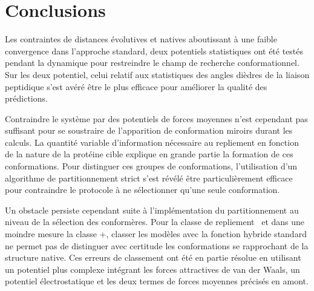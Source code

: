\chapter{Conclusions} %
\label{ch:03-04} %


Les contraintes de distances évolutives et natives aboutissant à une faible convergence dans l'approche standard, deux potentiels statistiques ont été testés pendant la dynamique pour restreindre le champ de recherche conformationnel. Sur les deux potentiel, celui relatif aux statistiques des angles dièdres de la liaison peptidique s'est avéré être le plus efficace pour améliorer la qualité des prédictions. 

Contraindre le système par des potentiels de forces moyennes n'est cependant pas suffisant pour se soustraire de l'apparition de conformation miroirs durant les calculs. La quantité variable d'information nécessaire au repliement en fonction de la nature de la protéine cible \citep{murzin_principles_1994} explique en grande partie la formation de ces conformations. Pour distinguer ces groupes de conformations, l'utilisation d'un algorithme de partitionnement strict s'est révélé être particulièrement efficace pour contraindre le protocole à ne sélectionner qu'une seule conformation. 

Un obstacle persiste cependant suite à l'implémentation du partitionnement au niveau de la sélection des conformères. Pour la classe de repliement \textbeta~et dans une moindre mesure la classe \textalpha+\textbeta, classer les modèles avec la fonction hybride standard ne permet pas de distinguer avec certitude les conformations se rapprochant de la structure native. Ces erreurs de classement ont été en partie résolue en utilisant un potentiel plus complexe intégrant les forces attractives de van der Waals, un potentiel électrostatique et les deux termes de forces moyennes précisés en amont.


